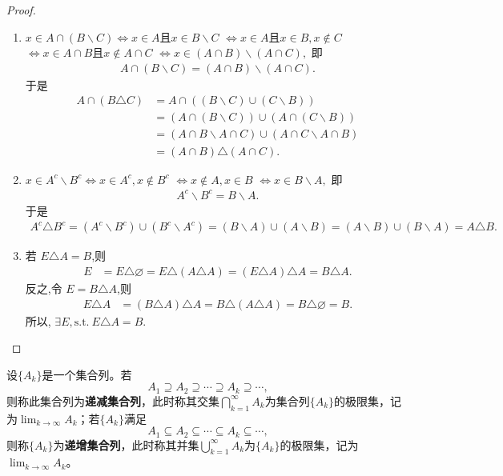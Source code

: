 \documentclass[../../main.tex]{subfiles}%
\begin{document}
\begin{proof}
\begin{enumerate}[(1)]
\item $x\in A\cap(B\backslash C)\Leftrightarrow x\in A \text{且} x\in B\backslash C$
$\Leftrightarrow x\in A \text{且} x\in B,x\notin C$
$\Leftrightarrow x\in A\cap B \text{且} x\notin A\cap C$
$\Leftrightarrow x\in (A\cap B)\backslash (A\cap C),$
即
\begin{align*}
A \cap (B \backslash  C) = (A \cap B) \backslash  (A \cap C).
\end{align*}
于是
\begin{align*}
A \cap (B\triangle C) &= A \cap ((B \backslash  C) \cup (C \backslash  B)) \\
&=(A \cap (B \backslash  C)) \cup (A \cap (C \backslash  B)) \\
&=(A \cap B \backslash  A \cap C) \cup (A \cap C \backslash  A \cap B) \\
&=(A \cap B)\triangle(A \cap C).
\end{align*}

\item $x\in A^c \backslash  B^c \Leftrightarrow x\in A^c,x\notin B^c$
$\Leftrightarrow x\notin A,x\in B$
$\Leftrightarrow x\in B \backslash  A,$
即
\begin{align*}
A^c \backslash  B^c = B \backslash  A.
\end{align*}
于是
\begin{align*}
A^c\triangle B^c = (A^c \backslash  B^c) \cup (B^c \backslash  A^c) 
= (B \backslash  A) \cup (A \backslash  B) = (A \backslash  B) \cup (B \backslash  A) = A\triangle B.
\end{align*}


\item 若 $E\triangle A = B$,则
\begin{align*}
E &= E\triangle \varnothing = E\triangle (A\triangle A) = (E\triangle A)\triangle A = B\triangle A.
\end{align*}
反之,令 $E = B\triangle A$,则
\begin{align*}
E\triangle A &= (B\triangle A)\triangle A = B\triangle (A\triangle A) = B\triangle \varnothing = B.
\end{align*}
所以, $\exists E,\text{s.t.}\ E\triangle A = B.$
\end{enumerate}

\end{proof}

\begin{definition}[递增、递减集合列]\label{definition:递增、递减集合列}
设\(\{A_k\}\)是一个集合列。若
\[A_1\supseteq A_2\supseteq\cdots\supseteq A_k\supseteq\cdots,\]
则称此集合列为\textbf{递减集合列}，此时称其交集\(\bigcap_{k = 1}^{\infty}A_k\)为集合列\(\{A_k\}\)的极限集，记为\(\lim_{k\rightarrow\infty}A_k\)；若\(\{A_k\}\)满足
\[A_1\subseteq A_2\subseteq\cdots\subseteq A_k\subseteq\cdots,\]
则称\(\{A_k\}\)为\textbf{递增集合列}，此时称其并集\(\bigcup_{k = 1}^{\infty}A_k\)为\(\{A_k\}\)的极限集，记为\(\lim_{k\rightarrow\infty}A_k\)。
\end{definition}
\end{document}
